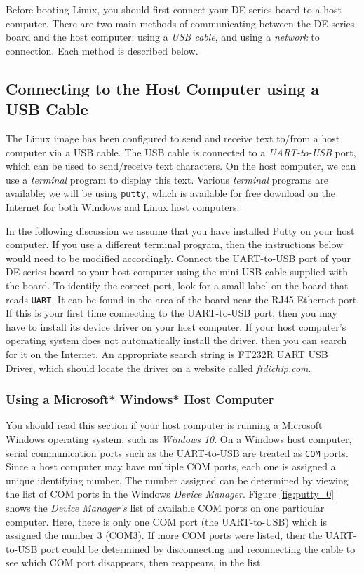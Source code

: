 \documentclass[11pt, twoside, pdftex]{article}
\begin{document}
Before booting Linux, you should first connect your DE-series board to a host computer.
There are two main methods of communicating between the DE-series board and the host
computer: using a {\it USB cable}, and using a {\it network} to connection. Each method is 
described below.

\subsection{Connecting to the Host Computer using a USB Cable}
\label{sec:conn_USB}

The Linux image has been configured to send and receive text to/from a host computer via a 
USB cable. The USB cable is connected to a {\it UART-to-USB} port, which can be used to 
send/receive text characters. On the host computer, we can use a \textit{terminal} program 
to display this text. Various \textit{terminal} programs are available; we will be using
\texttt{putty}, which is available for free download on the Internet for both Windows and 
Linux host computers. 

In the following discussion we assume that you have installed Putty on your host computer.
If you use a different terminal program, then the instructions below
would need to be modified accordingly. Connect the UART-to-USB port of your DE-series board 
to your host computer using the mini-USB cable supplied with the board. To identify the
correct port, look for a small label on the board that reads \texttt{UART}. It can be found 
in the area of the board near the RJ45 Ethernet port. If this is your first time connecting to 
the UART-to-USB port, then you may have to install its device driver on your host computer. If 
your host computer's operating system does not automatically install the driver, then you 
can search for it on the Internet. An appropriate search string is {\sf FT232R UART USB 
Driver}, which should locate the driver on a website called {\it ftdichip.com}.

\subsubsection{Using a Microsoft* Windows* Host Computer}

You should read this section if your host computer is running a Microsoft Windows
operating system, such as {\it Windows 10}. 
On a Windows host computer, serial communication ports such as the UART-to-USB 
are treated as \texttt{COM} ports. Since a host computer may have multiple COM ports, 
each one is assigned a unique identifying number. The number assigned can be 
determined by viewing the list of COM ports in the Windows
\textit{Device Manager}. Figure \ref{fig:putty_0} shows the \textit{Device Manager's} list of 
available COM ports on one particular computer. Here, there is only one COM port (the UART-to-USB)
which is assigned the number 3 (COM3). If more COM ports were listed, then the UART-to-USB
port could be determined by disconnecting and reconnecting the cable to see which COM port 
disappears, then reappears, in the list.
\end{document}
